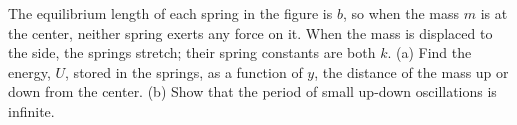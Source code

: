 The equilibrium length of each spring in the figure is $b$, so when the mass $m$ 
        is at the center, neither spring exerts any force on it. When the mass is
        displaced to the side, the springs stretch; their spring constants are both $k$.\hwendpart
        (a) Find the energy, $U$, stored in the springs, as a function of $y$, the distance
        of the mass up or down from the center.\answercheck\hwendpart
        (b) Show that the period of small up-down oscillations is infinite.

